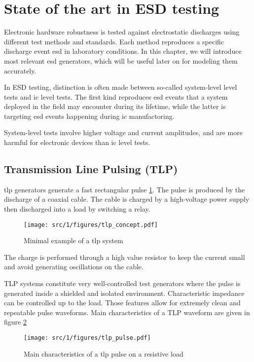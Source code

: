 \section{State of the art in ESD testing}
\label{sec:state-art-esd-testing}

Electronic hardware robustness is tested against electrostatic discharges using different test methods and standards.
Each method reproduces a specific discharge event \gls{esd} in laboratory conditions.
In this chapter, we will introduce most relevant \gls{esd} generators, which will be useful later on for modeling them accurately.

In ESD testing, distinction is often made between so-called system-level level tests and \gls{ic} level tests.
The first kind reproduces \gls{esd} events that a system deployed in the field may encounter during its lifetime, while the latter is targeting \gls{esd} events
happening during \gls{ic} manufactoring.

System-level tests involve higher voltage and current amplitudes, and are more harmful for electronic devices than \gls{ic} level tests.

\subsection{Transmission Line Pulsing (TLP)}

\gls{tlp} generators generate a fast rectangular pulse \ref{tlp_concept}.
The pulse is produced by the discharge of a coaxial cable.
The cable is charged by a high-voltage power supply then discharged into a load by switching a relay.

\begin{figure}[!h]
  \centering
  \texttt{[image: src/1/figures/tlp\_concept.pdf]}
  \caption{Minimal example of a \gls{tlp} system}
  \label{tlp_concept}
\end{figure}

The charge is performed through a high value resistor to keep the current small and avoid generating oscillations on the cable.

TLP systems constitute very well-controlled test generators where the pulse is generated inside a shielded and isolated environment.
Characteristic impedance can be controlled up to the load.
Those features allow for extremely clean and repeatable pulse waveforms.
Main characteristics of a TLP waveform are given in figure \ref{tlp_pulse}

\begin{figure}[!h]
  \centering
  \texttt{[image: src/1/figures/tlp\_pulse.pdf]}
  \caption{Main characteristics of a \gls{tlp} pulse on a resistive load}
  \label{tlp_pulse}
\end{figure}

